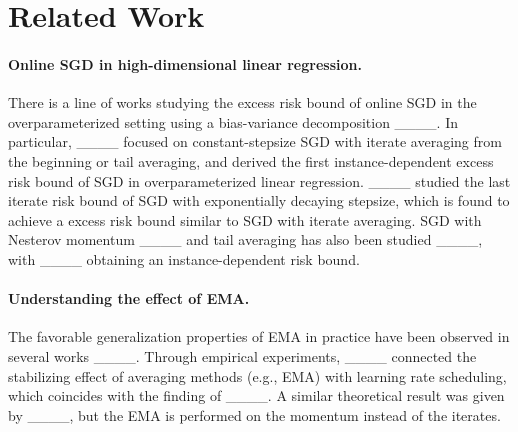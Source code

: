 \section{Related Work}
\paragraph{Online SGD in high-dimensional linear regression.}
There is a line of works studying the excess risk bound of online SGD in the overparameterized setting using a bias-variance decomposition ____.
In particular, ____ focused on constant-stepsize SGD with iterate averaging from the beginning or tail averaging, and derived the first instance-dependent excess risk bound of SGD in overparameterized linear regression.
____ studied the last iterate risk bound of SGD with exponentially decaying stepsize, which is found to achieve a excess risk bound similar to SGD with iterate averaging.
SGD with Nesterov momentum ____ and tail averaging has also been studied ____, with ____ obtaining an instance-dependent risk bound.

\paragraph{Understanding the effect of EMA.}
The favorable generalization properties of EMA in practice have been observed in several works ____.
Through empirical experiments, ____ connected the stabilizing effect of averaging methods (e.g., EMA) with learning rate scheduling, which coincides with the finding of ____.
A similar theoretical result was given by ____, but the EMA is performed on the momentum instead of the iterates.